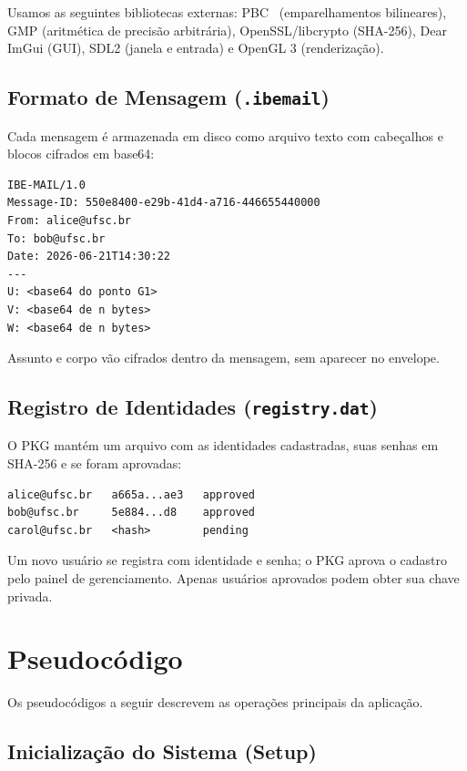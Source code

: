 Usamos as seguintes bibliotecas externas: PBC~\cite{pbc} (emparelhamentos bilineares), GMP
(aritmética de precisão arbitrária), OpenSSL/libcrypto (SHA-256), Dear ImGui (GUI), SDL2
(janela e entrada) e OpenGL 3 (renderização).

\subsection{Formato de Mensagem (\texttt{.ibemail})}

Cada mensagem é armazenada em disco como arquivo texto com cabeçalhos e blocos cifrados em
base64:

\begin{verbatim}
IBE-MAIL/1.0
Message-ID: 550e8400-e29b-41d4-a716-446655440000
From: alice@ufsc.br
To: bob@ufsc.br
Date: 2026-06-21T14:30:22
---
U: <base64 do ponto G1>
V: <base64 de n bytes>
W: <base64 de n bytes>
\end{verbatim}

Assunto e corpo vão cifrados dentro da mensagem, sem aparecer no envelope.

\subsection{Registro de Identidades (\texttt{registry.dat})}

O PKG mantém um arquivo com as identidades cadastradas, suas senhas em SHA-256 e se foram
aprovadas:

\begin{verbatim}
alice@ufsc.br   a665a...ae3   approved
bob@ufsc.br     5e884...d8    approved
carol@ufsc.br   <hash>        pending
\end{verbatim}

Um novo usuário se registra com identidade e senha; o PKG aprova o cadastro pelo painel de
gerenciamento. Apenas usuários aprovados podem obter sua chave privada.


\section{Pseudocódigo}
\label{sec:pseudocodigo}

Os pseudocódigos a seguir descrevem as operações principais da aplicação.

\subsection{Inicialização do Sistema (Setup)}

